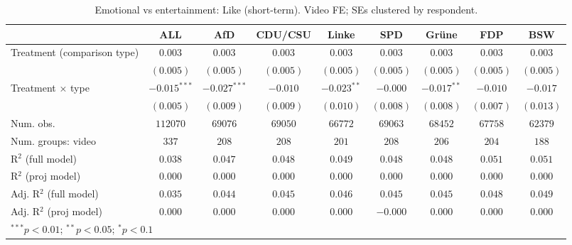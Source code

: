 
\begin{table}
\begin{center}
\begin{tabular}{l c c c c c c c c}
\hline
 & ALL & AfD & CDU/CSU & Linke & SPD & Grüne & FDP & BSW \\
\hline
Treatment (comparison type) & $0.003$        & $0.003$        & $0.003$   & $0.003$       & $0.003$   & $0.003$       & $0.003$   & $0.003$   \\
                            & $(0.005)$      & $(0.005)$      & $(0.005)$ & $(0.005)$     & $(0.005)$ & $(0.005)$     & $(0.005)$ & $(0.005)$ \\
Treatment × type            & $-0.015^{***}$ & $-0.027^{***}$ & $-0.010$  & $-0.023^{**}$ & $-0.000$  & $-0.017^{**}$ & $-0.010$  & $-0.017$  \\
                            & $(0.005)$      & $(0.009)$      & $(0.009)$ & $(0.010)$     & $(0.008)$ & $(0.008)$     & $(0.007)$ & $(0.013)$ \\
\hline
Num. obs.                   & $112070$       & $69076$        & $69050$   & $66772$       & $69063$   & $68452$       & $67758$   & $62379$   \\
Num. groups: video          & $337$          & $208$          & $208$     & $201$         & $208$     & $206$         & $204$     & $188$     \\
R$^2$ (full model)          & $0.038$        & $0.047$        & $0.048$   & $0.049$       & $0.048$   & $0.048$       & $0.051$   & $0.051$   \\
R$^2$ (proj model)          & $0.000$        & $0.000$        & $0.000$   & $0.000$       & $0.000$   & $0.000$       & $0.000$   & $0.000$   \\
Adj. R$^2$ (full model)     & $0.035$        & $0.044$        & $0.045$   & $0.046$       & $0.045$   & $0.045$       & $0.048$   & $0.049$   \\
Adj. R$^2$ (proj model)     & $0.000$        & $0.000$        & $0.000$   & $0.000$       & $-0.000$  & $0.000$       & $0.000$   & $0.000$   \\
\hline
\multicolumn{9}{l}{\scriptsize{$^{***}p<0.01$; $^{**}p<0.05$; $^{*}p<0.1$}}
\end{tabular}
\caption{Emotional vs entertainment: Like (short-term). Video FE; SEs clustered by respondent.}
\label{tab:compare_emotional_vs_entertainment_like}
\end{center}
\end{table}
